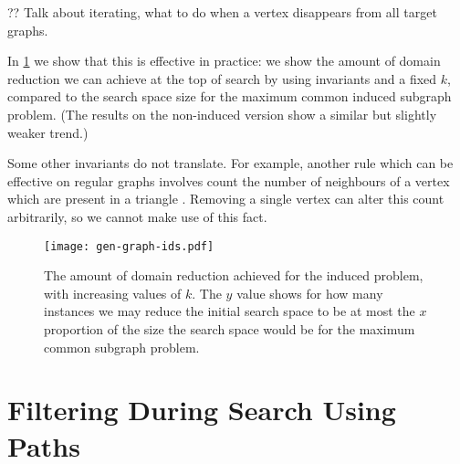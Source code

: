 \documentclass[letterpaper]{article}
\theoremstyle{definition}
\begin{document}

?? Talk about iterating, what to do when a vertex disappears from all target graphs.

In \cref{figure:ids} we show that this is effective in practice: we show the amount of domain reduction
we can achieve at the top of search by using invariants and a fixed $k$, compared to the search
space size for the maximum common induced subgraph problem. (The results on the non-induced version
show a similar but slightly weaker trend.)

Some other invariants do not translate. For example, another rule which can be effective on regular
graphs involves count the number of neighbours of a vertex which are present in a triangle
\cite{mckay2014practical}. Removing a single vertex can alter this count arbitrarily, so we cannot
make use of this fact.

\begin{figure}
    \centering
    \texttt{[image: gen-graph-ids.pdf]}
    \caption{The amount of domain reduction achieved for the induced problem, with increasing values
    of $k$. The $y$ value shows for how many instances we may reduce the initial search space to be
    at most the $x$ proportion of the size the search space would be for the maximum common subgraph
    problem.}\label{figure:ids}
\end{figure}

\section{Filtering During Search Using Paths}\label{section:pathfiltering}
\end{document}
